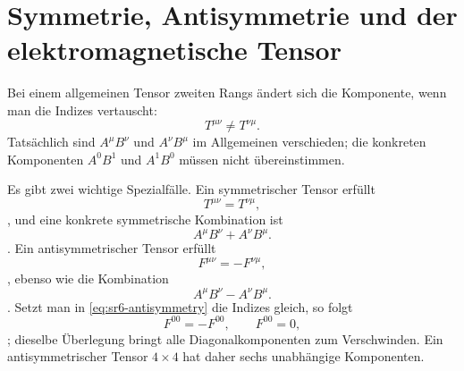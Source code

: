 \begin{classroomqa}\end{classroomqa}

\begin{classroomqa}\end{classroomqa}

\section{Symmetrie, Antisymmetrie und der elektromagnetische Tensor}

Bei einem allgemeinen Tensor zweiten Rangs ändert sich die Komponente, wenn man die Indizes vertauscht: \begin{equation}
T^{\mu\nu}\neq T^{\nu\mu}.
\end{equation}Tatsächlich sind \(A^\mu B^\nu\) und \(A^\nu B^\mu\) im Allgemeinen verschieden; die konkreten Komponenten \(A^0B^1\) und \(A^1B^0\) müssen nicht übereinstimmen.

Es gibt zwei wichtige Spezialfälle. Ein symmetrischer Tensor erfüllt \begin{equation}
T^{\mu\nu}=T^{\nu\mu},
\end{equation}, und eine konkrete symmetrische Kombination ist \begin{equation}
A^\mu B^\nu+A^\nu B^\mu.
\end{equation}. Ein antisymmetrischer Tensor erfüllt \begin{equation}
F^{\mu\nu}=-F^{\nu\mu},
\label{eq:sr6-antisymmetry}
\end{equation}, ebenso wie die Kombination \begin{equation}
A^\mu B^\nu-A^\nu B^\mu.
\end{equation}. Setzt man in \eqref{eq:sr6-antisymmetry} die Indizes gleich, so folgt \begin{equation}
F^{00}=-F^{00},
\qquad
F^{00}=0,
\end{equation}; dieselbe Überlegung bringt alle Diagonalkomponenten zum Verschwinden. Ein antisymmetrischer Tensor \(4\times4\) hat daher sechs unabhängige Komponenten.

